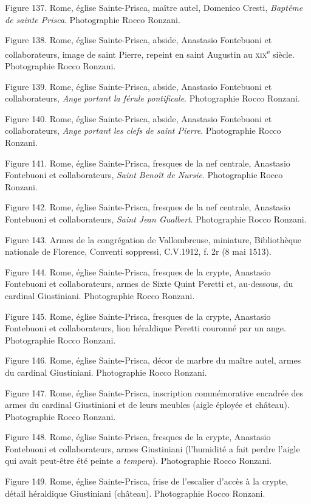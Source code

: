 \documentclass[12pt,twoside,openany]{book}
\begin{document}
Figure 137. Rome, église Sainte-Prisca, maître autel, Domenico Cresti,\textit{ Baptême de sainte Prisca}. Photographie Rocco Ronzani.

Figure 138. Rome, église Sainte-Prisca, abside, Anastasio Fontebuoni et collaborateurs, image de saint Pierre, repeint en saint Augustin au \textsc{xix}\textsuperscript{e} siècle. Photographie Rocco Ronzani.

Figure 139. Rome, église Sainte-Prisca, abside, Anastasio Fontebuoni et collaborateurs, \textit{Ange portant la férule pontificale}. Photographie Rocco Ronzani.

Figure 140. Rome, église Sainte-Prisca, abside, Anastasio Fontebuoni et collaborateurs, \textit{Ange portant les clefs de saint Pierre}. Photographie Rocco Ronzani.

Figure 141. Rome, église Sainte-Prisca, fresques de la nef centrale, Anastasio Fontebuoni et collaborateurs, \textit{Saint Benoît de Nursie}. Photographie Rocco Ronzani.

Figure 142. Rome, église Sainte-Prisca, fresques de la nef centrale, Anastasio Fontebuoni et collaborateurs, \textit{Saint Jean Gualbert}. Photographie Rocco Ronzani.

Figure 143. Armes de la congrégation de Vallombreuse, miniature, Bibliothèque nationale de Florence, Conventi soppressi, C.V.1912, f. 2r (8 mai 1513).

Figure 144. Rome, église Sainte-Prisca, fresques de la crypte, Anastasio Fontebuoni et collaborateurs, armes de Sixte Quint Peretti et, au-dessous, du cardinal Giustiniani. Photographie Rocco Ronzani.

Figure 145. Rome, église Sainte-Prisca, fresques de la crypte, Anastasio Fontebuoni et collaborateurs, lion héraldique Peretti couronné par un ange. Photographie Rocco Ronzani.

Figure 146. Rome, église Sainte-Prisca, décor de marbre du maître autel, armes du cardinal Giustiniani. Photographie Rocco Ronzani.

Figure 147. Rome, église Sainte-Prisca, inscription commémorative encadrée des armes du cardinal Giustiniani et de leurs meubles (aigle éployée et château). Photographie Rocco Ronzani.

Figure 148. Rome, église Sainte-Prisca, fresques de la crypte, Anastasio Fontebuoni et collaborateurs, armes Giustiniani (l’humidité a fait perdre l’aigle qui avait peut-être été peinte \textit{a tempera}). Photographie Rocco Ronzani.

Figure 149. Rome, église Sainte-Prisca, frise de l’escalier d’accès à la crypte, détail héraldique Giustiniani (château). Photographie Rocco Ronzani.
\end{document}
